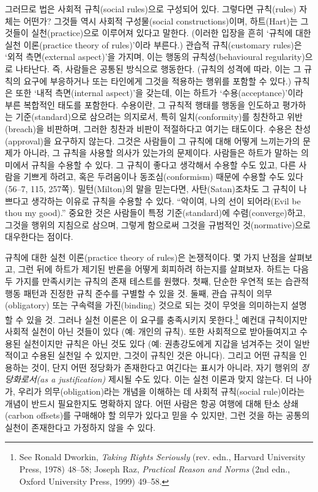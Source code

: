 \documentclass[12pt, oneside]{book}  %
\begin{document}
그러므로 법은 사회적 규칙(social rules)으로 구성되어 있다. 그렇다면
규칙(rules) 자체는 어떤가? 그것들 역시 사회적 구성물(social
constructions)이며, 하트(Hart)는 그것들이 실천(practice)으로 이루어져
있다고 말한다. (이러한 입장을 흔히 `규칙에 대한 실천 이론(practice
theory of rules)'이라 부른다.) 관습적 규칙(customary rules)은 `외적
측면(external aspect)'을 가지며, 이는 행동의 규칙성(behavioural
regularity)으로 나타난다. 즉, 사람들은 공통된 방식으로 행동한다. (규칙의
성격에 따라, 이는 그 규칙의 요구에 부응하거나 또는 타인에게 그것을
적용하는 행위를 포함할 수 있다.) 규칙은 또한 `내적 측면(internal
aspect)'을 갖는데, 이는 하트가 `수용(acceptance)'이라 부른 복합적인
태도를 포함한다. 수용이란, 그 규칙적 행태를 행동을 인도하고 평가하는
기준(standard)으로 삼으려는 의지로서, 특히 일치(conformity)를 칭찬하고
위반(breach)을 비판하며, 그러한 칭찬과 비판이 적절하다고 여기는
태도이다. 수용은 찬성(approval)을 요구하지 않는다. 그것은 사람들이 그
규칙에 대해 어떻게 느끼는가의 문제가 아니라, 그 규칙을 사용할 의사가
있는가의 문제이다. 사람들은 하트가 말하는 의미에서 규칙을 수용할 수
있다. 그 규칙이 좋다고 생각해서 수용할 수도 있고, 다른 사람을 기쁘게
하려고, 혹은 두려움이나 동조심(conformism) 때문에 수용할 수도 있다
(56--7, 115, 257쪽). 밀턴(Milton)의 말을 믿는다면, 사탄(Satan)조차도 그
규칙이 나쁘다고 생각하는 이유로 규칙을 수용할 수 있다. ``악이여, 나의
선이 되어라(Evil be thou my good).'' 중요한 것은 사람들이 특정
기준(standard)에 수렴(converge)하고, 그것을 행위의 지침으로 삼으며,
그렇게 함으로써 그것을 규범적인 것(normative)으로 대우한다는 점이다.

규칙에 대한 실천 이론(practice theory of rules)은 논쟁적이다. 몇 가지
난점을 살펴보고, 그런 뒤에 하트가 제기된 반론을 어떻게 회피하려 하는지를
살펴보자. 하트는 다음 두 가지를 만족시키는 규칙의 존재 테스트를 원했다.
첫째, 단순한 우연적 또는 습관적 행동 패턴과 진정한 규칙 준수를 구별할 수
있을 것. 둘째, 관습 규칙이 의무(obligatory) 또는 구속력을 가진(binding)
것으로 되는 것이 무엇을 의미하는지 설명할 수 있을 것. 그러나 실천 이론은
이 요구를 충족시키지 못한다.\footnote{See Ronald Dworkin, \emph{Taking
  Rights Seriously} (rev. edn., Harvard University Press, 1978) 48--58;
  Joseph Raz, \emph{Practical Reason and Norms} (2nd edn., Oxford
  University Press, 1999) 49--58.} 예컨대 규칙이지만 사회적 실천이 아닌
것들이 있다 (예: 개인의 규칙). 또한 사회적으로 받아들여지고 수용된
실천이지만 규칙은 아닌 것도 있다 (예: 권총강도에게 지갑을 넘겨주는 것이
일반적이고 수용된 실천일 수 있지만, 그것이 규칙인 것은 아니다). 그리고
어떤 규칙을 인용하는 것이, 단지 어떤 정당화가 존재한다고 여긴다는 표시가
아니라, 자기 행위의 \emph{정당화로서(as a justification)} 제시될 수도
있다. 이는 실천 이론과 맞지 않는다. 더 나아가, 우리가
의무(obligation)라는 개념을 이해하는 데 사회적 규칙(social rule)이라는
개념이 반드시 필요한지도 명확하지 않다. 어떤 사람은 항공 여행에 대해
탄소 상쇄(carbon offsets)를 구매해야 할 의무가 있다고 믿을 수 있지만,
그런 것을 하는 공통의 실천이 존재한다고 가정하지 않을 수 있다.
\end{document}
